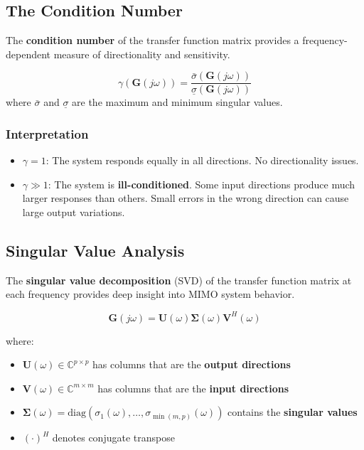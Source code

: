 \subsection{The Condition Number}

The \textbf{condition number} of the transfer function matrix provides a frequency-dependent measure of directionality and sensitivity.

\begin{definition}
\begin{equation}
\gamma(\mathbf{G}(j\omega)) = \frac{\bar{\sigma}(\mathbf{G}(j\omega))}{\underline{\sigma}(\mathbf{G}(j\omega))}
\end{equation}
where $\bar{\sigma}$ and $\underline{\sigma}$ are the maximum and minimum singular values.
\end{definition}

\subsubsection{Interpretation}

\begin{itemize}
\item $\gamma = 1$: The system responds equally in all directions. No directionality issues.

\item $\gamma \gg 1$: The system is \textbf{ill-conditioned}. Some input directions produce much larger responses than others. Small errors in the wrong direction can cause large output variations.
\end{itemize}


\subsection{Singular Value Analysis}

The \textbf{singular value decomposition} (SVD) of the transfer function matrix at each frequency provides deep insight into MIMO system behavior.

\begin{equation}
\mathbf{G}(j\omega) = \mathbf{U}(\omega)\boldsymbol{\Sigma}(\omega)\mathbf{V}^H(\omega)
\end{equation}

where:
\begin{itemize}
\item $\mathbf{U}(\omega) \in \mathbb{C}^{p \times p}$ has columns that are the \textbf{output directions}
\item $\mathbf{V}(\omega) \in \mathbb{C}^{m \times m}$ has columns that are the \textbf{input directions}
\item $\boldsymbol{\Sigma}(\omega) = \text{diag}(\sigma_1(\omega), \ldots, \sigma_{\min(m,p)}(\omega))$ contains the \textbf{singular values}
\item $(\cdot)^H$ denotes conjugate transpose
\end{itemize}

